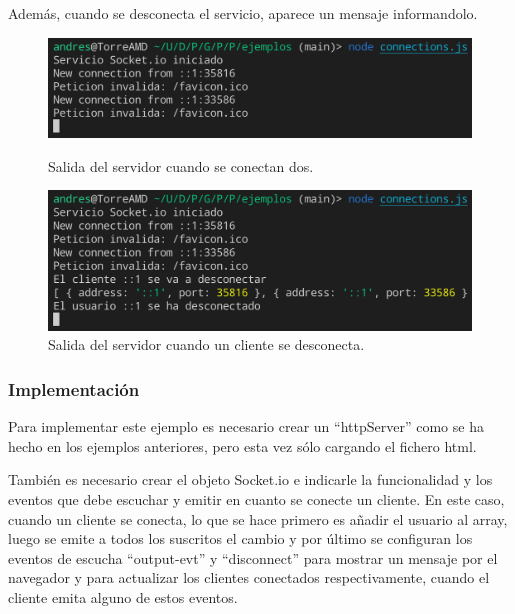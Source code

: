\documentclass{article}
\begin{document}
Además, cuando se desconecta el servicio, aparece un mensaje informandolo.

\begin{figure}[H]
    \centering
    \begin{minipage}[H]{0.49\textwidth}
        \centering
        \includegraphics[width=\textwidth]{images/connectserver.png}
        \caption{Salida del servidor cuando se conectan dos.}
    \end{minipage}
    \hfill
    \begin{minipage}[H]{0.49\textwidth}
        \centering
        \includegraphics[width=\textwidth]{images/disconnectserver.png}
        \caption{Salida del servidor cuando un cliente se desconecta.}
    \end{minipage}
\end{figure}

\subsubsection{Implementación}
Para implementar este ejemplo es necesario crear un ``httpServer'' como se ha hecho en los ejemplos anteriores, pero esta vez sólo cargando el fichero html.

También es necesario crear el objeto Socket.io e indicarle la funcionalidad y los eventos que debe escuchar y emitir en cuanto se conecte un cliente. En este caso, cuando un cliente se conecta, lo que se hace primero es añadir el usuario al array, luego se emite a todos los suscritos el cambio y por último se configuran los eventos de escucha ``output-evt'' y ``disconnect'' para mostrar un mensaje por el navegador y para actualizar los clientes conectados respectivamente, cuando el cliente emita alguno de estos eventos.
\end{document}
